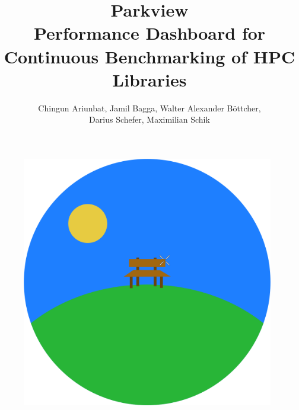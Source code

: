 \documentclass[parskip=full,11pt]{scrartcl}
\title{\Huge Parkview\\
    \LARGE \normalfont Performance Dashboard for Continuous Benchmarking of HPC Libraries}
\author{Chingun Ariunbat, Jamil Bagga, Walter Alexander B\"ottcher,\\Darius Schefer, Maximilian Schik}
\begin{document}
\maketitle
\begin{figure}[h]
	\includegraphics[width=11cm]{parkview.png}
	\centering
\end{figure}

\thispagestyle{empty}

\clearpage
{}

\tableofcontents
\clearpage







\appendix
\end{document}
